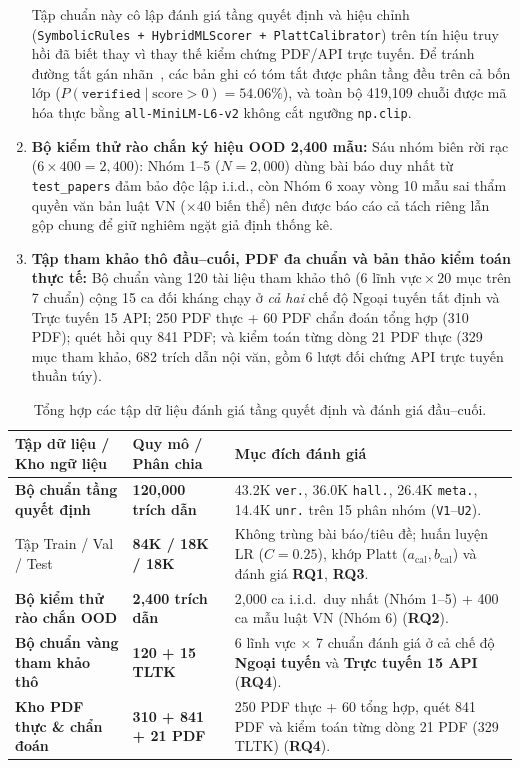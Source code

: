 \begin{enumerate}
\begin{itemize}
    \end{itemize}
    Tập chuẩn này cô lập đánh giá tầng quyết định và hiệu chỉnh (\texttt{SymbolicRules + HybridMLScorer + PlattCalibrator}) trên tín hiệu truy hồi đã biết thay vì thay thế kiểm chứng PDF/API trực tuyến. Để tránh đường tắt gán nhãn~\cite{poliak2018hypothesis}, các bản ghi có tóm tắt được phân tầng đều trên cả bốn lớp ($P(\texttt{verified} \mid \text{score} > 0) = 54.06\%$), và toàn bộ 419,109 chuỗi được mã hóa thực bằng \texttt{all-MiniLM-L6-v2} không cắt ngưỡng \texttt{np.clip}.
    \item \textbf{Bộ kiểm thử rào chắn ký hiệu OOD 2,400 mẫu:} Sáu nhóm biên rời rạc ($6 \times 400 = 2{,}400$): Nhóm 1--5 ($N = 2{,}000$) dùng bài báo duy nhất từ \texttt{test\_papers} đảm bảo độc lập i.i.d., còn Nhóm 6 xoay vòng 10 mẫu sai thẩm quyền văn bản luật VN ($\times 40$ biến thể) nên được báo cáo cả tách riêng lẫn gộp chung để giữ nghiêm ngặt giả định thống kê.
    \item \textbf{Tập tham khảo thô đầu--cuối, PDF đa chuẩn và bản thảo kiểm toán thực tế:} Bộ chuẩn vàng 120 tài liệu tham khảo thô ($6\text{ lĩnh vực} \times 20\text{ mục}$ trên 7 chuẩn) cộng 15 ca đối kháng chạy ở \emph{cả hai} chế độ Ngoại tuyến tất định và Trực tuyến 15 API; 250 PDF thực + 60 PDF chẩn đoán tổng hợp (310 PDF); quét hồi quy 841 PDF; và kiểm toán từng dòng 21 PDF thực (329 mục tham khảo, 682 trích dẫn nội văn, gồm 6 lượt đối chứng API trực tuyến thuần túy).
\end{enumerate}

{\setlength{\tabcolsep}{3.5pt}
\begin{table}[!htbp]
\centering
\caption{Tổng hợp các tập dữ liệu đánh giá tầng quyết định và đánh giá đầu--cuối.}\label{tab:dataset}
\begin{tabular}{|L{0.35}|L{0.23}|L{0.42}|}
\hline
\textbf{Tập dữ liệu / Kho ngữ liệu} & \textbf{Quy mô / Phân chia} & \textbf{Mục đích đánh giá} \\
\hline
\textbf{Bộ chuẩn tầng quyết định} & \textbf{120,000 trích dẫn} & 43.2K \texttt{ver.}, 36.0K \texttt{hall.}, 26.4K \texttt{meta.}, 14.4K \texttt{unr.} trên 15 phân nhóm (\texttt{V1}--\texttt{U2}). \\
\hline
\quad Tập Train / Val / Test & \textbf{84K / 18K / 18K} & Không trùng bài báo/tiêu đề; huấn luyện LR ($C=0.25$), khớp Platt ($a_{\text{cal}}, b_{\text{cal}}$) và đánh giá \textbf{RQ1}, \textbf{RQ3}. \\
\hline
\textbf{Bộ kiểm thử rào chắn OOD} & \textbf{2,400 trích dẫn} & 2,000 ca i.i.d.\ duy nhất (Nhóm 1--5) + 400 ca mẫu luật VN (Nhóm 6) (\textbf{RQ2}). \\
\hline
\textbf{Bộ chuẩn vàng tham khảo thô} & \textbf{120 + 15 TLTK} & 6 lĩnh vực $\times$ 7 chuẩn đánh giá ở cả chế độ \textbf{Ngoại tuyến} và \textbf{Trực tuyến 15 API} (\textbf{RQ4}). \\
\hline
\textbf{Kho PDF thực \& chẩn đoán} & \textbf{310 + 841 + 21 PDF} & 250 PDF thực + 60 tổng hợp, quét 841 PDF và kiểm toán từng dòng 21 PDF (329 TLTK) (\textbf{RQ4}). \\
\hline
\end{tabular}
\end{table}
}

